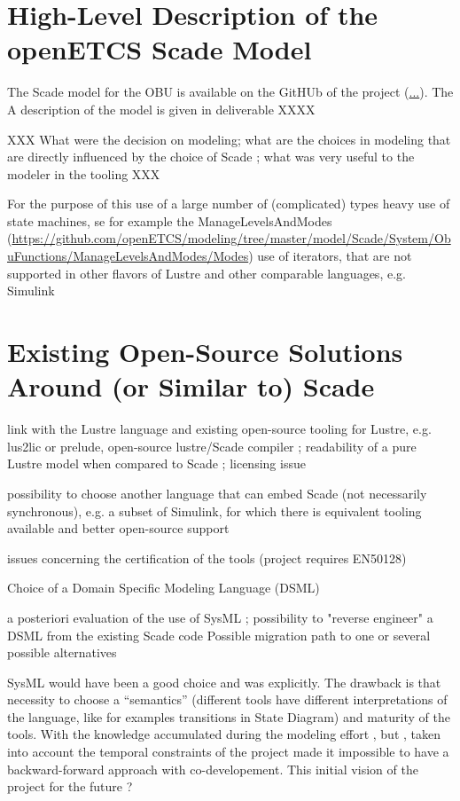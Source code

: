\documentclass{template/openetcs_report}
\begin{document}
\section{High-Level Description of the openETCS Scade Model}

The Scade model for the OBU is available on the GitHUb of the project
(\url{...}). The A description of the model is given in deliverable XXXX


XXX What were the decision on modeling; what are the choices in modeling
that are directly influenced by the choice of Scade ; what was very
useful to the modeler in the tooling XXX

For the purpose of this 
use of a large number of (complicated) types heavy use of state
machines, se for example the ManageLevelsAndModes
(\url{https://github.com/openETCS/modeling/tree/master/model/Scade/System/ObuFunctions/ManageLevelsAndModes/Modes})
use of iterators, that are not supported in other flavors of Lustre
and other comparable languages, e.g. Simulink

\section{Existing Open-Source Solutions Around (or Similar to)
  Scade}

link with the Lustre language and existing open-source tooling for Lustre, e.g. lus2lic or prelude, open-source lustre/Scade compiler ; readability of a pure Lustre model when compared to Scade ; licensing issue

possibility to choose another language that can embed Scade (not
necessarily synchronous), e.g. a subset of Simulink, for which there
is equivalent tooling available and better open-source support

issues concerning the certification of the tools (project requires EN50128)

Choice of a Domain Specific Modeling Language (DSML)

a posteriori evaluation of the use of SysML ; possibility to "reverse
engineer" a DSML from the existing Scade code Possible migration path
to one or several possible alternatives


SysML would have been a good choice and was explicitly. The drawback
is that necessity to choose a ``semantics'' (different tools have
different interpretations of the language, like for examples
transitions in State Diagram) and maturity of the tools. With the
knowledge accumulated during the modeling effort , but , taken into
account the temporal constraints of the project made it impossible to
have a backward-forward approach with co-developement. This initial
vision of the project for the future ?
\end{document}
